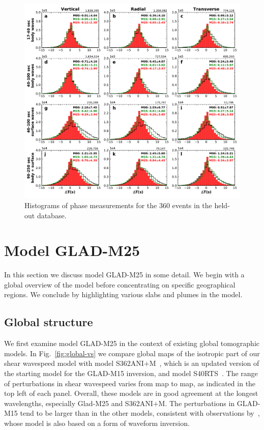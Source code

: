 \documentclass[extra,mreferee]{gji}
\begin{document}
\begin{figure}
  \centering
  \includegraphics[width=\textwidth]{figures/dt_histogram_360.pdf}
  \caption{Histograms of phase measurements for the 360 events in the held-out database.}
  \label{fig:phase_hist_360}
\end{figure}

\section{Model GLAD-M25}

In this section we discuss model GLAD-M25 in some detail.
We begin with a global overview of the model before concentrating on specific geographical regions.
We conclude by highlighting various slabs and plumes in the model.

\subsection{Global structure}

We first examine model GLAD-M25 in the context of existing global tomographic models.
In Fig.~\ref{fig:global-vs} we compare global maps of the isotropic part of our shear wavespeed model with model S362ANI$+$M~\citep{moulik2014anisotropic},
which is an updated version of the starting model for the GLAD-M15 inversion,
and model S40RTS~\citep{ritsema2011s40rts}.
The range of perturbations in shear wavespeed varies from map to map, as indicated in the top left of each panel.
Overall, these models are in good agreement at the longest wavelengths, especially Glad-M25 and S362ANI$+$M.
The perturbations in GLAD-M15 tend to be larger than in the other models,
consistent with observations by~\cite{french2014whole},
whose model is also based on a form of waveform inversion.
\end{document}
